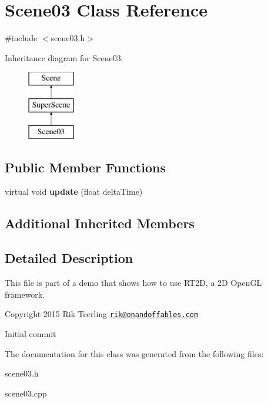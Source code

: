 \hypertarget{class_scene03}{}\section{Scene03 Class Reference}
\label{class_scene03}


{\ttfamily \#include $<$scene03.\+h$>$}

Inheritance diagram for Scene03\+:\begin{figure}[H]
\begin{center}
\leavevmode
\includegraphics[height=3.000000cm]{class_scene03}
\end{center}
\end{figure}
\subsection*{Public Member Functions}
\begin{DoxyCompactItemize}
\item 
\mbox{\label{class_scene03_a7f1ee2ee37db860eb64a418726f73e82}} 
virtual void {\bfseries update} (float delta\+Time)
\end{DoxyCompactItemize}
\subsection*{Additional Inherited Members}


\subsection{Detailed Description}
This file is part of a demo that shows how to use R\+T2D, a 2D Open\+GL framework.


\begin{DoxyItemize}
\item Copyright 2015 Rik Teerling \href{mailto:rik@onandoffables.com}{\tt rik@onandoffables.\+com}
\begin{DoxyItemize}
\item Initial commit 
\end{DoxyItemize}
\end{DoxyItemize}

The documentation for this class was generated from the following files\+:\begin{DoxyCompactItemize}
\item 
scene03.\+h\item 
scene03.\+cpp\end{DoxyCompactItemize}
